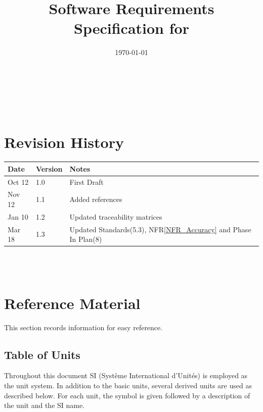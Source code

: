 \documentclass[12pt]{article}
\newcommand{\rref}[1]{R\ref{#1}}
\begin{document}
\title{Software Requirements Specification for \progname} 
\author{\authname}
\date{\today}
	
\maketitle

~\newpage


\tableofcontents

~\newpage

\section*{Revision History}

\begin{tabularx}{\textwidth}{p{3cm}p{2cm}X}
\toprule {\bf Date} & {\bf Version} & {\bf Notes}\\
\midrule
Oct 12 & 1.0 & First Draft\\
Nov 12 & 1.1 & Added references \\
Jan 10 & 1.2 & Updated traceability matrices \\
Mar 18 & 1.3 & Updated Standards(5.3), NF\rref{NFR_Accuracy} and Phase In Plan(8) \\
\bottomrule
\end{tabularx}

~\\

~\newpage

\section{Reference Material}

This section records information for easy reference.

\subsection{Table of Units}

Throughout this document SI (Syst\`{e}me International d'Unit\'{e}s) is employed
as the unit system.  In addition to the basic units, several derived units are
used as described below.  For each unit, the symbol is given followed by a
description of the unit and the SI name.
~\newline
\end{document}
